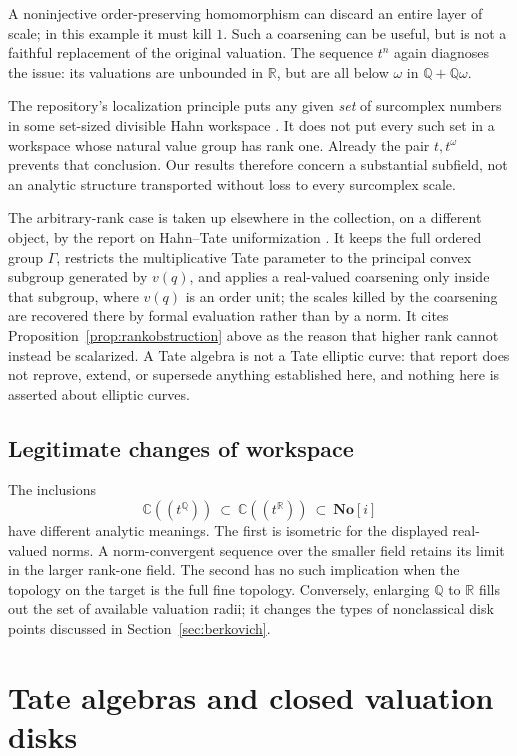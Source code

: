 \documentclass[11pt,a4paper]{article}
\numberwithin{equation}{section}
\theoremstyle{definition}
\theoremstyle{remark}
\newcommand{\No}{\mathbf{No}}
\newcommand{\C}{\mathbb C}
\newcommand{\R}{\mathbb R}
\newcommand{\Q}{\mathbb Q}
\begin{document}
A noninjective order-preserving homomorphism can discard an entire layer of
scale; in this example it must kill $1$. Such a coarsening can be useful, but
is not a faithful replacement of the original valuation. The sequence $t^n$
again diagnoses the issue: its valuations are unbounded in $\R$, but are all
below $\omega$ in $\Q+\Q\omega$.

The repository's localization principle puts any given \emph{set} of
surcomplex numbers in some set-sized divisible Hahn workspace
\cite{RepoFoundations}. It does not put every such set in a workspace whose
natural value group has rank one. Already the pair $t,t^\omega$ prevents
that conclusion. Our results therefore concern a substantial subfield, not an
analytic structure transported without loss to every surcomplex scale.

The arbitrary-rank case is taken up elsewhere in the collection, on a
different object, by the report on Hahn--Tate uniformization
\cite{RepoTate}. It keeps the full ordered group $\Gamma$, restricts the
multiplicative Tate parameter to the principal convex subgroup generated by
$v(q)$, and applies a real-valued coarsening only inside that subgroup,
where $v(q)$ is an order unit; the scales killed by the coarsening are
recovered there by formal evaluation rather than by a norm. It cites
Proposition~\ref{prop:rankobstruction} above as the reason that higher rank
cannot instead be scalarized. A Tate algebra is not a Tate elliptic curve:
that report does not reprove, extend, or supersede anything established
here, and nothing here is asserted about elliptic curves.

\subsection{Legitimate changes of workspace}
The inclusions
\[
 \C((t^\Q))\ \subset\ \C((t^\R))\ \subset\ \No[i]
\]
have different analytic meanings. The first is isometric for the displayed
real-valued norms. A norm-convergent sequence over the smaller field retains
its limit in the larger rank-one field. The second has no such implication
when the topology on the target is the full fine topology. Conversely, enlarging
$\Q$ to $\R$ fills out the set of available valuation radii; it changes the
types of nonclassical disk points discussed in Section~\ref{sec:berkovich}.

\section{Tate algebras and closed valuation disks}
\label{sec:tate}
\end{document}
